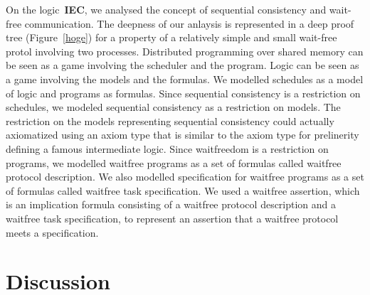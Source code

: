 \documentclass[doctor]{iscs-thesis}
\newcommand{\iec}{{\rm {\textbf{IEC}}}}
\begin{document}
On the logic~\iec, we analysed the concept of sequential consistency and wait-free
communication.
The deepness of our anlaysis is represented in a deep proof tree (Figure~\ref{hoge}) for a
property of a relatively simple and small wait-free protol involving two processes.
Distributed programming over shared memory can be seen as a game involving the scheduler
and the program.
Logic can be seen as a game involving the models and the formulas.
We modelled schedules as a model of logic and programs as formulas.
Since sequential consistency is a restriction on schedules,
we modeled sequential consistency as a restriction on models.
The restriction on the models representing sequential consistency could actually
axiomatized using an axiom type that is similar to the axiom type for prelinerity defining
a famous intermediate logic.
Since waitfreedom is a restriction on programs,
we modelled waitfree programs as a set of formulas called waitfree protocol description.
We also modelled specification for waitfree programs as a set of formulas called waitfree
task specification.
We used a waitfree assertion, which is
an implication formula consisting of a waitfree protocol description and a
waitfree task specification,
 to represent 
an assertion that a waitfree protocol meets a specification.


\section{Discussion}
\label{discuss}
\end{document}
